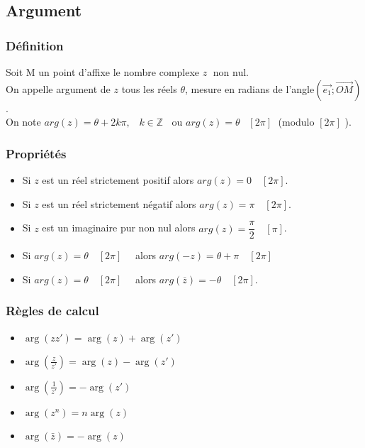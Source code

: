 \documentclass[french]{yLectureNote}
\begin{document}
\subsection{Argument}
\subsubsection{Définition}
Soit M un point d'affixe le nombre complexe $z\;$ non nul.\\
On appelle argument de $z$ tous les réels $\theta$, mesure en radians de l'angle$ \left( \overrightarrow{e_1};\overrightarrow{OM}\right)$ .\\ On note $arg(z)=\theta +2k\pi,\;\;\; k \in \mathbb{Z}\;\;$ ou $arg(z)=\theta \;\;\;[2\pi]\;$ (modulo $[2\pi]$ ).


\subsubsection{Propriétés}
\begin{itemize}
\item Si $z$ est un réel strictement positif alors $arg(z)=0 \quad [2\pi]$.
\item Si $z$ est un réel strictement négatif alors $arg(z)=\pi \quad [2\pi]$.
\item Si $z$ est un imaginaire pur non nul alors $arg(z)=\dfrac{\pi}{2} \quad [\pi]$.
\item Si $arg(z)=\theta \quad [2\pi]\quad $ alors $arg(-z)=\theta+\pi \quad [2\pi]\quad $
\item Si $arg(z)=\theta \quad [2\pi]\quad $ alors  $arg \left( \overline{z}\right) =-\theta \quad [2\pi] $.
\end{itemize}
\subsubsection{Règles de calcul}
\begin{itemize}
\item $\arg(zz') = \arg(z)+\arg(z')$
\item $\arg(\frac{z}{z'}) = \arg(z)-\arg(z')$
\item$\arg(\frac{1}{z'}) = -\arg(z')$
\item$\arg(z^n) = n\arg(z)$
\item$\arg(\bar{z}) = -\arg(z)$
\end{itemize}
\end{document}
